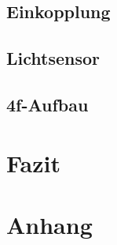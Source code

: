 \documentclass[12pt,a4paper]{article}
\begin{document}
	\subsection{Einkopplung}
	
	\subsection{Lichtsensor}
	
	\subsection{4f-Aufbau}
	
	\label{chap:abb+ft}
	
	
	
	
	\clearpage
	\newpage
	
	\section{Fazit} %
	
	
	\newpage
	\clearpage
	
	
	
	
	
	\newpage
	\clearpage
	
	
	
	
	
	
	\newpage
	
	\listoffigures %
	
	\newpage
	\clearpage
	
	\section{Anhang}
	
	
\end{document}
